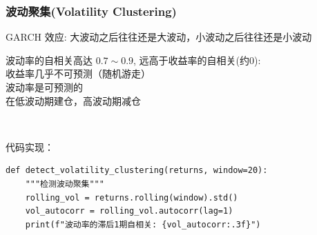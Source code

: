 \begin{frame}[fragile]
    \frametitle{波动聚集(Volatility Clustering)}

    \alert{GARCH 效应}: 大波动之后往往还是大波动，小波动之后往往还是小波动

    波动率的自相关高达 $0.7 \sim 0.9$, 远高于收益率的自相关(约0):  \\
    \hspace{2em} 收益率几乎不可预测（随机游走） \\
    \hspace{2em} 波动率是可预测的 \\
    \hspace{2em} 在低波动期建仓，高波动期减仓

    ~\par
    代码实现：
    \begin{verbatim}
def detect_volatility_clustering(returns, window=20):
    """检测波动聚集"""
    rolling_vol = returns.rolling(window).std()
    vol_autocorr = rolling_vol.autocorr(lag=1)
    print(f"波动率的滞后1期自相关: {vol_autocorr:.3f}")
    \end{verbatim}
\end{frame}


